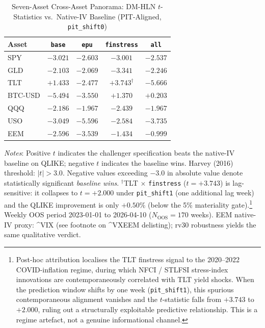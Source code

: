 \documentclass[12pt,a4paper]{article}
\begin{document}
\begin{table}[H]
\centering
\small
\begin{threeparttable}
\caption{Seven-Asset Cross-Asset Panorama: DM-HLN $t$-Statistics vs.\ Native-IV Baseline (PIT-Aligned, \texttt{pit\_shift0})}
\label{tab:panorama_7asset}
\begin{tabular}{@{}lcccc@{}}
\toprule
Asset & \texttt{base} & \texttt{epu} & \texttt{finstress} & \texttt{all} \\
\midrule
SPY     & $-3.021$ & $-2.603$ & $-3.001$           & $-2.537$ \\
GLD     & $-2.103$ & $-2.069$ & $-3.341$           & $-2.246$ \\
TLT     & $+1.433$ & $-2.477$ & $+3.743^{\dag}$    & $-5.666$ \\
BTC-USD & $-5.494$ & $-3.550$ & $+1.370$           & $+0.203$ \\
QQQ     & $-2.186$ & $-1.967$ & $-2.439$           & $-1.967$ \\
USO     & $-3.049$ & $-5.596$ & $-2.584$           & $-3.735$ \\
EEM     & $-2.596$ & $-3.539$ & $-1.434$           & $-0.999$ \\
\bottomrule
\end{tabular}
\begin{tablenotes}
\small
\item \textit{Notes}: Positive $t$ indicates the challenger specification beats the native-IV baseline on QLIKE; negative $t$ indicates the baseline wins. Harvey (2016) threshold: $|t| > 3.0$. Negative values exceeding $-3.0$ in absolute value denote statistically significant \emph{baseline wins}. $^{\dag}$TLT $\times$ \texttt{finstress} ($t = +3.743$) is lag-sensitive: it collapses to $t = +2.000$ under \texttt{pit\_shift1} (one additional lag week) and the QLIKE improvement is only $+0.50\%$ (below the 5\% materiality gate).\footnote{Post-hoc attribution localises the TLT finstress signal to the 2020--2022 COVID-inflation regime, during which NFCI / STLFSI stress-index innovations are contemporaneously correlated with TLT yield shocks. When the prediction window shifts by one week (\texttt{pit\_shift1}), this spurious contemporaneous alignment vanishes and the $t$-statistic falls from $+3.743$ to $+2.000$, ruling out a structurally exploitable predictive relationship. This is a regime artefact, not a genuine informational channel.} Weekly OOS period 2023-01-01 to 2026-04-10 ($N_{\text{OOS}} = 170$ weeks). EEM native-IV proxy: \^{}VIX (see footnote on \^{}VXEEM delisting); rv30 robustness yields the same qualitative verdict.
\end{tablenotes}
\end{threeparttable}
\end{table}
\end{document}
